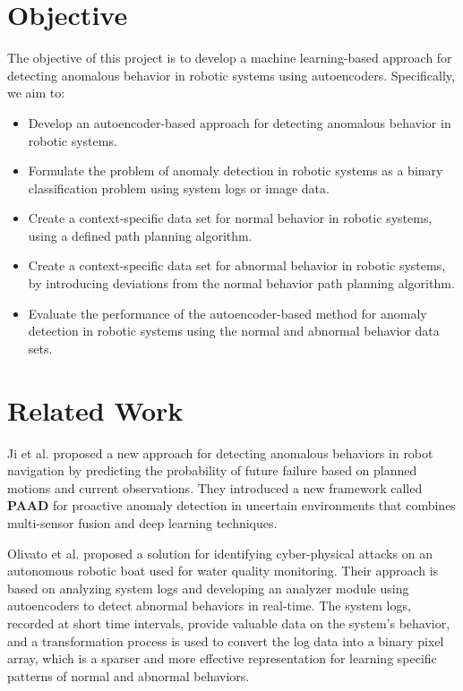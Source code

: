 \documentclass[12]{article}
\begin{document}
\section{Objective}

The objective of this project is to develop a machine learning-based approach for detecting anomalous behavior in robotic systems using autoencoders. Specifically, we aim to:



\begin{itemize}
\item Develop an autoencoder-based approach for detecting anomalous behavior in robotic systems.
\item Formulate the problem of anomaly detection in robotic systems as a binary classification problem using system logs or image data.
\item Create a context-specific data set for normal behavior in robotic systems, using a defined path planning algorithm.
\item Create a context-specific data set for abnormal behavior in robotic systems, by introducing deviations from the normal behavior path planning algorithm.
\item Evaluate the performance of the autoencoder-based method for anomaly detection in robotic systems using the normal and abnormal behavior data sets.
\end{itemize}

\section{Related Work}


Ji et al. \cite{b1} proposed a new approach for detecting anomalous behaviors in robot navigation by predicting the probability of future failure based on planned motions and current observations. They introduced a new framework called \textbf{PAAD} for proactive anomaly detection in uncertain environments that combines multi-sensor fusion and deep learning techniques.

Olivato et al. \cite{b2} proposed a solution for identifying cyber-physical attacks on an autonomous robotic boat used for water quality monitoring. Their approach is based on analyzing system logs and developing an analyzer module using autoencoders to detect abnormal behaviors in real-time. The system logs, recorded at short time intervals, provide valuable data on the system’s behavior, and a transformation process is used to convert the log data into a binary pixel array, which is a sparser and more effective representation for learning specific patterns of normal and abnormal behaviors.
\end{document}
